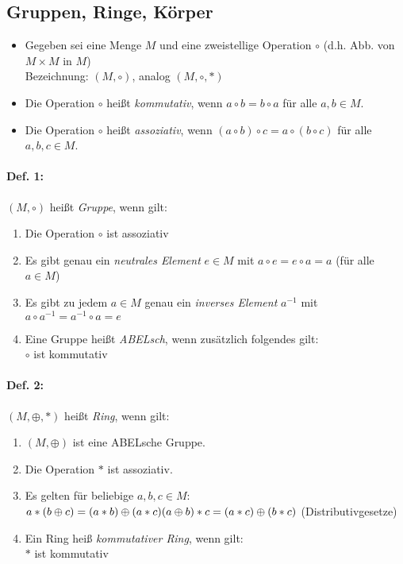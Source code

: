 
\subsection{Gruppen, Ringe, Körper} \label{sec:3}
\begin{itemize}
\item Gegeben sei eine Menge $M$ und eine zweistellige Operation $\circ$ (d.h. Abb. von $M\times M$ in $M$)\\
Bezeichnung: $(M,\circ)$, analog $(M, \circ, *)$
\item Die Operation $\circ$ heißt \emph{kommutativ}, wenn $a \circ b= b \circ a $ für alle $a, b \in M$.
\item Die Operation $\circ$ heißt \emph{assoziativ}, wenn $(a \circ b) \circ c =a \circ (b \circ c)$ für alle  $a, b, c \in M$.
\end{itemize}

\paragraph{Def. 1:}\parskp
$(M,\circ)$ heißt \emph{Gruppe}, wenn gilt:
\begin{enumerate}
\item Die Operation $\circ$ ist assoziativ
\item Es gibt genau ein \emph{neutrales Element} $e\in M$ mit $a\circ e = e\circ a = a$ (für alle $a \in M$)
\item Es gibt zu jedem $a \in M$ genau ein \emph{inverses Element} $a^{-1}$ mit $a\circ a^{-1}=a^{-1}\circ a = e$
\item Eine Gruppe heißt \emph{ABELsch}, wenn zusätzlich folgendes gilt:\\
$\circ$ ist kommutativ
\end{enumerate}

\paragraph{Def. 2:}\parskp
$(M,\oplus,*)$ heißt \emph{Ring}, wenn gilt:
\begin{enumerate}
\item $(M, \oplus)$ ist eine ABELsche Gruppe.
\item Die Operation $*$ ist assoziativ.
\item Es gelten für beliebige $a,b,c\in M$:\\
$a*(b\oplus c)=(a*b)\oplus (a*c)\\
(a \oplus b) *c = (a*c) \oplus (b*c)$ \qquad (Distributivgesetze)
\item Ein Ring heiß \emph{kommutativer Ring}, wenn gilt:\\
$*$ ist kommutativ
\end{enumerate}

